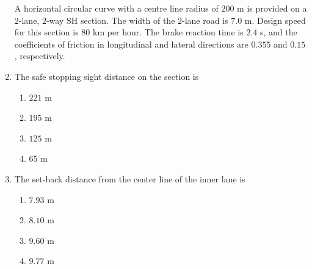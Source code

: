 \documentclass[journal]{IEEEtran}
\begin{document}
\begin{enumerate}
A horizontal circular curve with a centre line radius of $200$ m is provided on a $2$-lane, $2$-way SH section. The width of the $2$-lane road is $7.0$ m. Design speed for this section is $80$ km per hour. The brake reaction time is $2.4$ s, and the coefficients of friction in longitudinal and lateral directions are $0.355$ and $0.15$, respectively.
\vspace{0.1cm}

\item The safe stopping sight distance on the section is \hfill {}
\begin{enumerate}
\item $221$ m
\item $195$ m
\item $125$ m
\item $65$ m
\end{enumerate}

\item The set-back distance from the center line of the inner lane is \hfill {}
\begin{enumerate}
\item $7.93$ m
\item $8.10$ m
\item $9.60$ m
\item $9.77$ m
\end{enumerate}


\end{enumerate}
\end{document}

